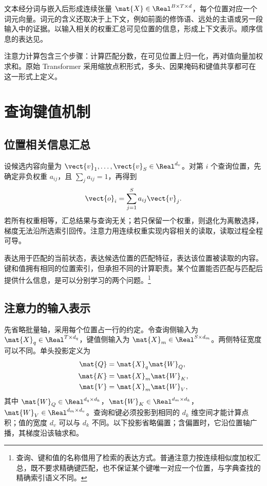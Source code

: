 \documentclass[../textbook.tex]{subfiles}
\begin{document}
\fi
{}

文本经分词与嵌入后形成连续张量 $\mat{X}\in\Real^{B\times T\times d}$，每个位置对应一个词元向量。词元的含义还取决于上下文，例如前面的修饰语、远处的主语或另一段输入中的证据。以输入相关的权重汇总可见位置的信息，形成上下文表示。顺序信息的表达见。

注意力计算包含三个步骤：计算匹配分数，在可见位置上归一化，再对值向量加权求和。原始 Transformer 采用缩放点积形式\cite{vaswani2017attention}，多头、因果掩码和键值共享都可在这一形式上定义。

\section{查询键值机制}

\subsection{位置相关信息汇总}
设候选内容向量为 $\vect{v}_1,\ldots,\vect{v}_S\in\Real^{d_v}$。对第 $i$ 个查询位置，先确定非负权重 $a_{ij}$，且 $\sum_j a_{ij}=1$，再得到
\begin{equation}
 \vect{o}_i=\sum_{j=1}^{S}a_{ij}\vect{v}_j.\label{eq:attn-weighted}
\end{equation}
若所有权重相等，汇总结果与查询无关；若只保留一个权重，则退化为离散选择，梯度无法沿所选索引回传。注意力用连续权重实现内容相关的读取，读取过程全程可导。

表达用于匹配的当前状态，表达候选位置的匹配特征，表达该位置被读取的内容。键和值拥有相同的位置索引，但承担不同的计算职责。某个位置能否匹配与匹配后提供什么信息，是可以分别学习的两个问题。\footnote{查询、键和值的名称借用了检索的表达方式。普通注意力按连续相似度加权汇总，既不要求精确键匹配，也不保证某个键唯一对应一个位置，与字典查找的精确索引语义不同。}

\subsection{注意力的输入表示}
先省略批量轴，采用每个位置占一行的约定。令查询侧输入为 $\mat{X}_q\in\Real^{T\times d_q}$，键值侧输入为 $\mat{X}_m\in\Real^{S\times d_m}$。两侧特征宽度可以不同。单头投影定义为
\begin{equation}\label{eq:attn-projections}
 \begin{aligned}
  \mat{Q}&=\mat{X}_q\mat{W}_Q,\\
  \mat{K}&=\mat{X}_m\mat{W}_K,\\
  \mat{V}&=\mat{X}_m\mat{W}_V,
 \end{aligned}
\end{equation}
其中 $\mat{W}_Q\in\Real^{d_q\times d_k}$，$\mat{W}_K\in\Real^{d_m\times d_k}$，$\mat{W}_V\in\Real^{d_m\times d_v}$。查询和键必须投影到相同的 $d_k$ 维空间才能计算点积；值的宽度 $d_v$ 可以与 $d_k$ 不同。以下投影省略偏置；含偏置时，它沿位置轴广播，其梯度沿该轴求和。
\end{document}
